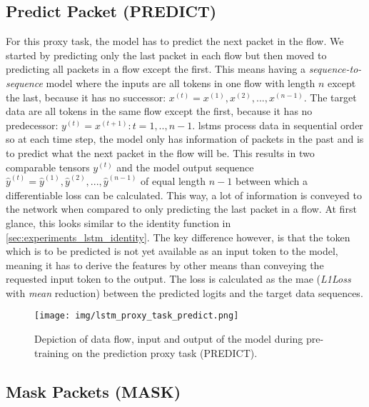 \subsection{Predict Packet (PREDICT)} \label{sec:experiments:lstm:predict_packet}

For this proxy task, the model has to predict the next packet in the flow. We started by predicting only the last packet in each flow but then moved to predicting all packets in a flow except the first. This means having a \textit{sequence-to-sequence} model where the inputs are all tokens in one flow with length $n$ except the last, because it has no successor: $x^{(t)} = x^{(1)}, x^{(2)}, ..., x^{(n-1)}$. The target data are all tokens in the same flow except the first, because it has no predecessor: $y^{(t)} = x^{(t+1)} : t = 1,..,n-1$. \glspl{lstm} process data in sequential order so at each time step, the model only has information of packets in the past and is to predict what the next packet in the flow will be. This results in two comparable tensors $y^{(t)}$ and the model output sequence $\hat{y}^{(t)} = \hat{y}^{(1)}, \hat{y}^{(2)}, ..., \hat{y}^{(n-1)}$ of equal length $n-1$ between which a differentiable loss can be calculated. This way, a lot of information is conveyed to the network when compared to only predicting the last packet in a flow. At first glance, this looks similar to the identity function in \ref{sec:experiments_lstm_identity}. The key difference however, is that the token which is to be predicted is not yet available as an input token to the model, meaning it has to derive the features by other means than conveying the requested input token to the output. The loss is calculated as the \gls{mae} (\textit{L1Loss} with \textit{mean} reduction) between the predicted logits and the target data sequences.

\begin{figure}[h]
	\centering
	\texttt{[image: img/lstm\_proxy\_task\_predict.png]}
	\caption{Depiction of data flow, input and output of the model during pre-training on the prediction proxy task (PREDICT).}
	\label{fig:experiments:lstm_proxy_task_predict}
\end{figure}

\subsection{Mask Packets (MASK)} \label{sec:experiments:lstm:mask_packet}

